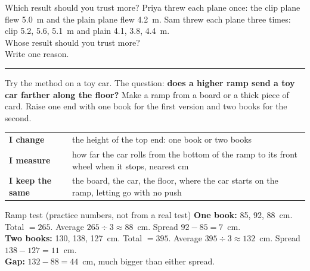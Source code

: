 \begin{puzzle}{Which result should you trust more?}
Priya threw each plane once: the clip plane flew 5.0~m and the plain plane flew 4.2~m. Sam threw each plane three times: clip 5.2, 5.6, 5.1~m and plain 4.1, 3.8, 4.4~m.\\
Whose result should you trust more? \wline[2cm]\\
Write one reason.\\
\rule{\linewidth}{0.5pt}
\end{puzzle}
\clearpage

Try the method on a toy car. The question: \textbf{does a higher ramp send a toy car farther along the floor?} Make a ramp from a board or a thick piece of card. Raise one end with one book for the first version and two books for the second.

\begin{center}
\sffamily\small\renewcommand{\arraystretch}{1.5}
\begin{tabular}{@{}p{3.4cm}p{7.6cm}@{}}
\toprule
\textbf{I change} & the height of the top end: one book or two books\\
\textbf{I measure} & how far the car rolls from the bottom of the ramp to its front wheel when it stops, nearest cm\\
\textbf{I keep the same} & the board, the car, the floor, where the car starts on the ramp, letting go with no push\\
\bottomrule
\end{tabular}
\end{center}

\begin{center}
\end{center}

\begin{worked}{Ramp test (practice numbers, not from a real test)}
\textbf{One book:} 85, 92, 88~cm. Total $=265$. Average $265\div3\approx88$~cm. Spread $92-85=7$~cm.\\
\textbf{Two books:} 130, 138, 127~cm. Total $=395$. Average $395\div3\approx132$~cm. Spread $138-127=11$~cm.\\
\textbf{Gap:} $132-88=44$~cm, much bigger than either spread.
\end{worked}

